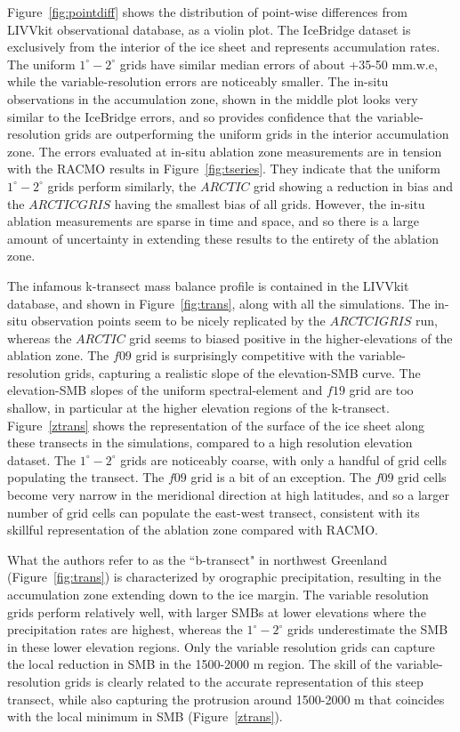 \documentclass[draft]{agujournal2019}
\begin{document}
Figure~\ref{fig:pointdiff} shows the distribution of point-wise differences from LIVVkit observational database, as a violin plot. The IceBridge dataset is exclusively from the interior of the ice sheet and represents accumulation rates. The uniform $1^{\circ}-2^{\circ}$ grids have similar median errors of about +35-50 mm.w.e, while the variable-resolution errors are noticeably smaller. The in-situ observations in the accumulation zone, shown in the middle plot looks very similar to the IceBridge errors, and so provides confidence that the variable-resolution grids are outperforming the uniform grids in the interior accumulation zone. The errors evaluated at in-situ ablation zone measurements are in tension with the RACMO results in Figure~\ref{fig:tseries}. They indicate that the uniform $1^{\circ}-2^{\circ}$ grids perform similarly, the $ARCTIC$ grid showing a reduction in bias and the $ARCTICGRIS$ having the smallest bias of all grids. However, the in-situ ablation measurements are sparse in time and space, and so there is a large amount of uncertainty in extending these results to the entirety of the ablation zone.

The infamous k-transect mass balance profile is contained in the LIVVkit database, and shown in Figure~\ref{fig:trans}, along with all the simulations. The in-situ observation points seem to be nicely replicated by the $ARCTCIGRIS$ run, whereas the $ARCTIC$ grid seems to biased positive in the higher-elevations of the ablation zone. The $f09$ grid is surprisingly competitive with the variable-resolution grids, capturing a realistic slope of the elevation-SMB curve. The elevation-SMB slopes of the uniform spectral-element and $f19$ grid are too shallow, in particular at the higher elevation regions of the k-transect. Figure~\ref{ztrans} shows the representation of the surface of the ice sheet along these transects in the simulations, compared to a high resolution elevation dataset. The $1^{\circ}-2^{\circ}$ grids are noticeably coarse, with only a handful of grid cells populating the transect. The $f09$ grid is a bit of an exception. The $f09$ grid cells become very narrow in the meridional direction at high latitudes, and so a larger number of grid cells can populate the east-west transect, consistent with its skillful representation of the ablation zone compared with RACMO.

What the authors refer to as the ``b-transect" in northwest Greenland (Figure~\ref{fig:trans}) is characterized by orographic precipitation, resulting in the accumulation zone extending down to the ice margin. The variable resolution grids perform relatively well, with larger SMBs at lower elevations where the precipitation rates are highest, whereas the $1^{\circ}-2^{\circ}$ grids underestimate the SMB in these lower elevation regions. Only the variable resolution grids can capture the local reduction in SMB in the 1500-2000 m region. The skill of the variable-resolution grids is clearly related to the accurate representation of this steep transect, while also capturing the protrusion around 1500-2000 m that coincides with the local minimum in SMB (Figure~\ref{ztrans}).
\end{document}
